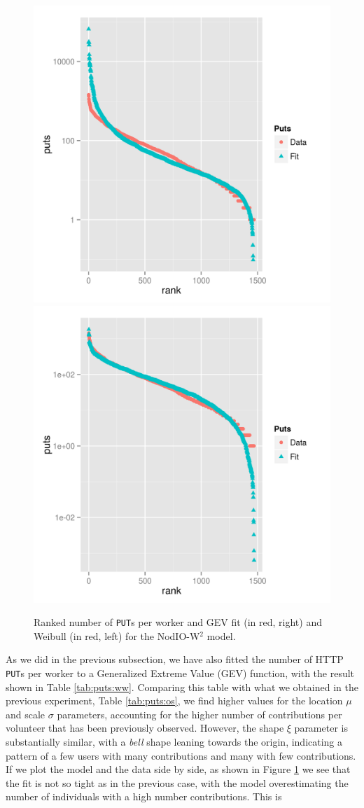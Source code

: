 \documentclass[journal,onecolumn]{IEEEtran}
\begin{document}
\begin{figure}[!htb]
\centering
\includegraphics[width=0.49\linewidth]{gev-fit-ww.png}
\includegraphics[width=0.49\linewidth]{weibull-fit-ww.png}
\caption{Ranked number of {\tt PUT}s per worker and GEV fit (in red, right) 
and Weibull (in red, left) for the {\sf NodIO-W$^2$} model.}  
\label{fig:gev:w2}
\end{figure}
%
As we did in the previous subsection, we have also fitted the number
of HTTP {\tt PUT}s per worker to a  Generalized Extreme Value (GEV) function, with the result shown
in Table \ref{tab:puts:ww}. Comparing this table with what we obtained
in the previous experiment, Table \ref{tab:puts:os}, we find higher values
for the location $\mu$ and scale $\sigma$ parameters, accounting for
the higher number of contributions per volunteer that has been
previously observed. However, the shape $\xi$ parameter is
substantially similar, with a {\em bell} shape leaning towards the
origin, indicating a pattern of a few users with many contributions
and many with few contributions. If we plot the model and the data
side by side, as shown in Figure \ref{fig:gev:w2} we see that the fit
is not so tight as in the previous case, with the model overestimating
the number of individuals with a high number contributions. This is
\end{document}
